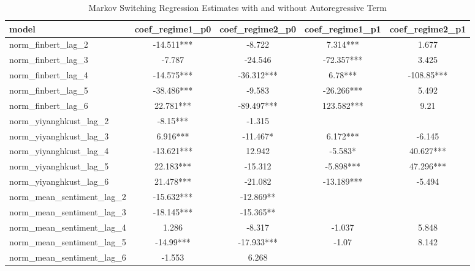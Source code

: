\begin{table}[ht]
\centering
\begin{tabular}{lcccc}
  \hline
model & coef\_regime1\_p0 & coef\_regime2\_p0 & coef\_regime1\_p1 & coef\_regime2\_p1 \\ 
  \hline
norm\_finbert\_lag\_2 & -14.511*** & -8.722 & 7.314*** & 1.677 \\ 
  norm\_finbert\_lag\_3 & -7.787 & -24.546 & -72.357*** & 3.425 \\ 
  norm\_finbert\_lag\_4 & -14.575*** & -36.312*** & 6.78*** & -108.85*** \\ 
  norm\_finbert\_lag\_5 & -38.486*** & -9.583 & -26.266*** & 5.492 \\ 
  norm\_finbert\_lag\_6 & 22.781*** & -89.497*** & 123.582*** & 9.21 \\ 
  norm\_yiyanghkust\_lag\_2 & -8.15*** & -1.315 &  &  \\ 
  norm\_yiyanghkust\_lag\_3 & 6.916*** & -11.467* & 6.172*** & -6.145 \\ 
  norm\_yiyanghkust\_lag\_4 & -13.621*** & 12.942 & -5.583* & 40.627*** \\ 
  norm\_yiyanghkust\_lag\_5 & 22.183*** & -15.312 & -5.898*** & 47.296*** \\ 
  norm\_yiyanghkust\_lag\_6 & 21.478*** & -21.082 & -13.189*** & -5.494 \\ 
  norm\_mean\_sentiment\_lag\_2 & -15.632*** & -12.869** &  &  \\ 
  norm\_mean\_sentiment\_lag\_3 & -18.145*** & -15.365** &  &  \\ 
  norm\_mean\_sentiment\_lag\_4 & 1.286 & -8.317 & -1.037 & 5.848 \\ 
  norm\_mean\_sentiment\_lag\_5 & -14.99*** & -17.933*** & -1.07 & 8.142 \\ 
  norm\_mean\_sentiment\_lag\_6 & -1.553 & 6.268 &  &  \\ 
   \hline
\end{tabular}
\caption{Markov Switching Regression Estimates with and without Autoregressive Term} 
\end{table}
